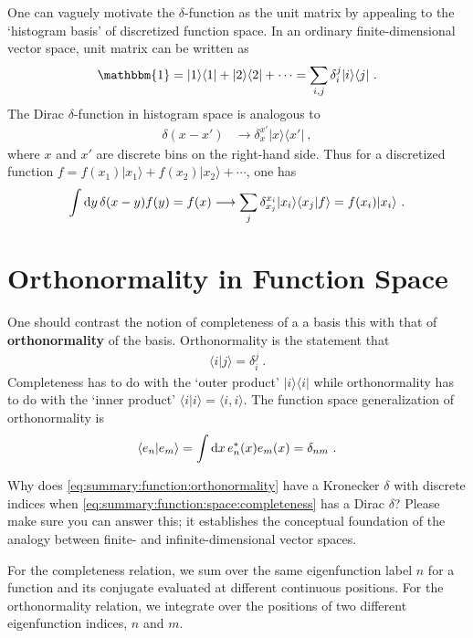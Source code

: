 \begin{example}
One can vaguely motivate the $\delta$-function as the unit matrix by appealing to the `histogram basis' of discretized function space. In an ordinary finite-dimensional vector space, unit matrix can be written as
\begin{align}
  \mathbbm{1} = |1\rangle\langle 1 | + |2\rangle\langle 2 | + \cdots
  = \sum_{i,j}\delta_{i}^j|i\rangle\langle j| \ .
\end{align}
The Dirac $\delta$-function in histogram space is analogous to
\begin{align}
  \delta(x-x') &\to \delta_{x}^{x'}|x\rangle\langle x'| \ ,
\end{align}
where $x$ and $x'$ are discrete bins on the right-hand side. Thus for a discretized function $f = f(x_1)|x_1\rangle + f(x_2)|x_2\rangle + \cdots$, one has
\begin{align}
  \int \operatorname{d}\mkern-3mu^{}\mkern-1mu{y}\, \delta(x-y) f(y) = f(x) \longrightarrow \sum_j \delta_{x_j}^{x_i}|x_i\rangle\langle x_j| f\rangle  =  f(x_i) |x_i\rangle\ .
\end{align}
\end{example}

\section{Orthonormality in Function Space}

One should contrast the notion of completeness of a a basis this with that of \textbf{orthonormality} of the basis. Orthonormality is the statement that
\begin{align}
  \langle i | j \rangle = \delta^j_i \ .
\end{align}
Completeness has to do with the `outer product' $|i\rangle \langle i|$ while orthonormality has to do with the `inner product' $\langle i | i\rangle = \langle i, i\rangle$. The function space generalization of orthonormality is
\begin{align}
  \langle e_{n} | e_{m} \rangle = \int \operatorname{d}\mkern-3mu^{}\mkern-1mu{x} \, e_{n}^*(x) e_{m}(x) = \delta_{nm} \ .
  \label{eq:summary:function:orthonormality}
\end{align}
\begin{exercise}
Why does \eqref{eq:summary:function:orthonormality} have a Kronecker $\delta$ with discrete indices when \eqref{eq:summary:function:space:completeness} has a Dirac $\delta$? Please make sure you can answer this; it establishes the conceptual foundation of the analogy between finite- and infinite-dimensional vector spaces.
\end{exercise}
For the completeness relation, we sum over the same eigenfunction label $n$ for a function and its conjugate evaluated at different continuous positions. For the orthonormality relation, we integrate over the positions of two different eigenfunction indices, $n$ and $m$. 

